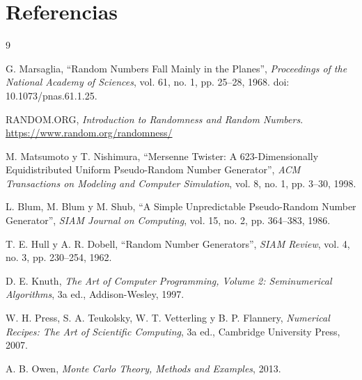 \documentclass[11pt,letterpaper]{article}
\begin{document}
\newpage
\section*{Referencias}
\begin{thebibliography}{9}

G. Marsaglia, ``Random Numbers Fall Mainly in the Planes'',
\emph{Proceedings of the National Academy of Sciences}, vol. 61, no. 1,
pp. 25--28, 1968. doi: 10.1073/pnas.61.1.25.

RANDOM.ORG, \emph{Introduction to Randomness and Random Numbers}.
\url{https://www.random.org/randomness/}

M. Matsumoto y T. Nishimura, ``Mersenne Twister: A 623-Dimensionally
Equidistributed Uniform Pseudo-Random Number Generator'',
\emph{ACM Transactions on Modeling and Computer Simulation}, vol. 8, no. 1,
pp. 3--30, 1998.

L. Blum, M. Blum y M. Shub, ``A Simple Unpredictable Pseudo-Random Number
Generator'', \emph{SIAM Journal on Computing}, vol. 15, no. 2, pp. 364--383,
1986.

T. E. Hull y A. R. Dobell, ``Random Number Generators'',
\emph{SIAM Review}, vol. 4, no. 3, pp. 230--254, 1962.

D. E. Knuth, \emph{The Art of Computer Programming, Volume 2:
Seminumerical Algorithms}, 3a ed., Addison-Wesley, 1997.

W. H. Press, S. A. Teukolsky, W. T. Vetterling y B. P. Flannery,
\emph{Numerical Recipes: The Art of Scientific Computing}, 3a ed.,
Cambridge University Press, 2007.

A. B. Owen, \emph{Monte Carlo Theory, Methods and Examples}, 2013.

\end{thebibliography}
\end{document}
